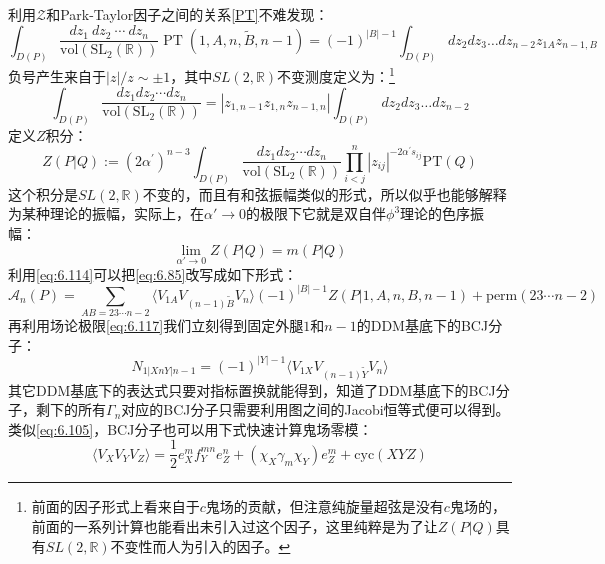 利用$\mathcal{Z}$和Park-Taylor因子之间的关系\ref{PT}不难发现：
\begin{equation}
	\label{eq:6.114}
	\int_{D(P)}\frac{dz_1\mathrm{~}dz_2\mathrm{~}\cdots\mathrm{~}dz_n}{\mathrm{vol}(\mathrm{SL}_2(\mathbb{R}))}\operatorname{PT}(1,A,n,\tilde{B},n-1)=(-1)^{|B|-1}\int_{D(P)}dz_2dz_3\ldots dz_{n-2}z_{1A}z_{n-1,B}
\end{equation}
负号产生来自于$|z|/z\sim\pm 1$，其中$SL(2,\mathbb{R})$不变测度定义为：\footnote{前面的因子形式上看来自于$c$鬼场的贡献，但注意纯旋量超弦是没有$c$鬼场的，前面的一系列计算也能看出未引入过这个因子，这里纯粹是为了让$Z(P|Q)$具有$SL(2,\mathbb{R})$不变性而人为引入的因子。}
\begin{equation}
	\int_{D(P)}\frac{dz_1dz_2\cdots dz_n}{\mathrm{vol}(\mathrm{SL}_2(\mathbb{R}))}=|z_{1,n-1}z_{1,n}z_{n-1,n}|\int_{D(P)}dz_2dz_3\ldots dz_{n-2}
\end{equation}
定义$Z$积分：
\begin{equation}
	Z(P|Q):=(2\alpha^{\prime})^{n-3}\int_{D(P)}\frac{dz_1dz_2\cdots dz_n}{\mathrm{vol}(\mathrm{SL}_2(\mathbb{R}))}{\prod_{i<j}^n|z_{ij}|^{-2\alpha^{\prime}s_{ij}}}\mathrm{PT}(Q)
\end{equation}
这个积分是$SL(2,\mathbb{R})$不变的，而且有和弦振幅类似的形式，所以似乎也能够解释为某种理论的振幅，实际上，在$\alpha'\to 0$的极限下它就是双自伴$\phi^3$理论的色序振幅：\cite{Cachazo:2013iea}
\begin{equation}
	\label{eq:6.117}
	\lim_{\alpha'\to 0}Z(P|Q) = m(P|Q)
\end{equation}
利用\ref{eq:6.114}可以把\ref{eq:6.85}改写成如下形式：
\begin{equation}
	\label{eq:118}
	\mathcal{A}_n(P)=\sum_{AB=23\cdots n-2}\langle V_{1A}V_{(n-1)\tilde{B}}V_n\rangle(-1)^{|B|-1}Z(P|1,A,n,B,n-1)+\mathrm{perm}(23\cdots n-2)
\end{equation}
再利用场论极限\ref{eq:6.117}我们立刻得到固定外腿$1$和$n-1$的DDM基底下的BCJ分子：
\begin{equation}
	\label{eq:6.119}
\boxed{
		N_{1|XnY|n-1}=(-1)^{|Y|-1}\langle V_{1X}V_{(n-1)\tilde{Y}}V_n\rangle
}
\end{equation}
其它DDM基底下的表达式只要对指标置换就能得到，知道了DDM基底下的BCJ分子，剩下的所有$\Gamma_n$对应的BCJ分子只需要利用图之间的Jacobi恒等式便可以得到。类似\ref{eq:6.105}，BCJ分子也可以用下式快速计算鬼场零模：
\begin{equation}
	\langle V_XV_YV_Z\rangle=\frac{1}{2}e_X^mf_Y^{mn}e_Z^n+(\chi_X\gamma_m\chi_Y)e_Z^m+\mathrm{cyc}(XYZ)
\end{equation}
